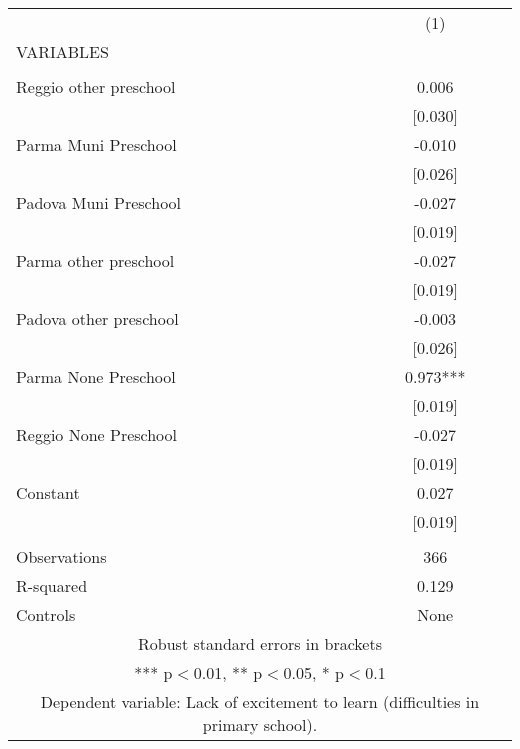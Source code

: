 \begin{tabular}{lc} \hline
 & (1) \\
VARIABLES &  \\ \hline
 &  \\
Reggio other preschool & 0.006 \\
 & [0.030] \\
Parma Muni Preschool & -0.010 \\
 & [0.026] \\
Padova Muni Preschool & -0.027 \\
 & [0.019] \\
Parma other preschool & -0.027 \\
 & [0.019] \\
Padova other preschool & -0.003 \\
 & [0.026] \\
Parma None Preschool & 0.973*** \\
 & [0.019] \\
Reggio None Preschool & -0.027 \\
 & [0.019] \\
Constant & 0.027 \\
 & [0.019] \\
 &  \\
Observations & 366 \\
R-squared & 0.129 \\
 Controls & None \\ \hline
\multicolumn{2}{c}{ Robust standard errors in brackets} \\
\multicolumn{2}{c}{ *** p$<$0.01, ** p$<$0.05, * p$<$0.1} \\
\multicolumn{2}{c}{ Dependent variable: Lack of excitement to learn (difficulties in primary school).} \\
\end{tabular}
